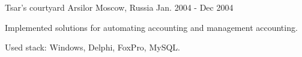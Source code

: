 \begin{cventries}
  \cventry
    {Tsar's courtyard}
    {Arsilor}
    {Moscow, Russia}
    {Jan. 2004 - Dec 2004}
    {
      \begin{cvitems}
        \item {Implemented solutions for automating accounting and management accounting.}
        \item {Used stack: Windows, Delphi, FoxPro, MySQL.}
      \end{cvitems}
    }

\end{cventries}
